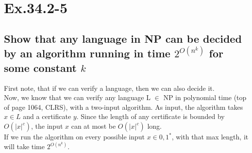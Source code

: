 \section*{Ex.34.2-5}
\subsection*{Show that any language in NP can be decided by an algorithm running in time $2^{O(n^k)}$ for some constant $k$}

First note, that if we can verify a language, then we can also decide it.
\\
Now, we know that we can verify any language L $\in$ NP in polynomial time (top of page 1064, CLRS), with a two-input algorithm. As input, the algorithm takes $x\in L$ and a certificate $y$. Since the length of any certificate is bounded by $O(|x|^c)$, the input $x$ can at most be $O(|x|^c)$ long.
\\
If we run the algorithm on every possible input $x\in {0,1}^*$, with that max length, it will take time $2^{O(n^k)}$.
